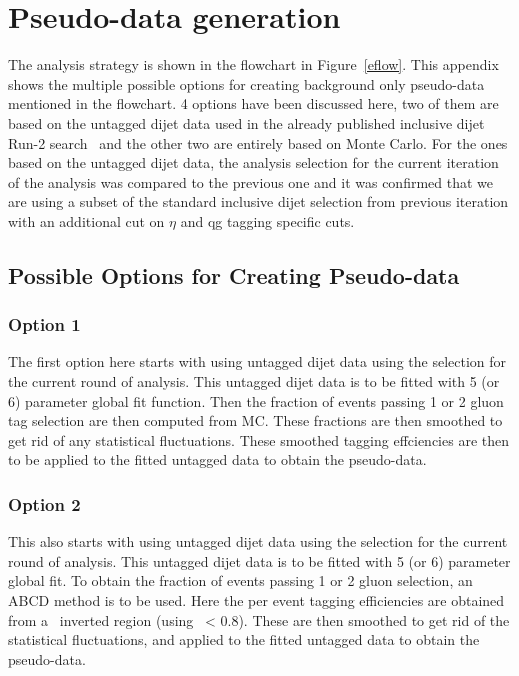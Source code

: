 \section{Pseudo-data generation}
\label{section:pseudo-data}

The analysis strategy is shown in the flowchart in Figure~\ref{eflow}. This appendix shows the multiple possible options for 
creating background only pseudo-data mentioned in the flowchart. 4 options have been discussed here, two of them are
based on the untagged dijet data used in the already published inclusive dijet Run-2 search~\cite{Nishu:2646455} and the other two are entirely based on Monte Carlo.
For the ones based on the untagged dijet data, the analysis selection for the current iteration of the analysis 
was compared to the previous one and it was confirmed that we are using a subset of the standard inclusive dijet selection from 
previous iteration with an additional cut on $\eta$ and qg tagging specific cuts.

\subsection{Possible Options for Creating Pseudo-data}
\subsubsection{Option 1}
The first option here starts with using untagged dijet data using the selection for the current round of analysis. 
This untagged dijet data is to be fitted with 5 (or 6) parameter global fit
function. Then the fraction of events passing 1 or 2 gluon tag selection are then computed from MC. These fractions are then smoothed to 
get rid of any statistical fluctuations. These smoothed tagging effciencies are then to be applied to the fitted untagged data to obtain the pseudo-data. 

\subsubsection{Option 2}
This also starts with using untagged dijet data using the selection for the current round of analysis. 
This untagged dijet data is to be fitted with 5 (or 6) parameter global fit. To obtain the fraction of events
passing 1 or 2 gluon selection, an ABCD method is to be used. Here the per event tagging efficiencies
are obtained from a \ystar\ inverted region (using \ystar\ < 0.8). These are then smoothed to get rid of the 
statistical fluctuations, and applied to the fitted untagged data to obtain the pseudo-data.  

